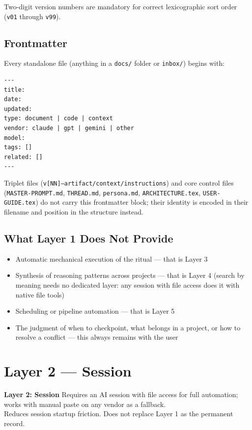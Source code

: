 \documentclass[12pt,letterpaper]{article}
\begin{document}
Two-digit version numbers are mandatory for correct lexicographic sort
order (\texttt{v01} through \texttt{v99}).

\subsection{Frontmatter}

Every standalone file (anything in a \texttt{docs/} folder or \texttt{inbox/})
begins with:

\begin{lstlisting}
---
title:
date:
updated:
type: document | code | context
vendor: claude | gpt | gemini | other
model:
tags: []
related: []
---
\end{lstlisting}

Triplet files (\texttt{v[NN]--artifact/context/instructions}) and core
control files (\texttt{MASTER-PROMPT.md}, \texttt{THREAD.md},
\texttt{persona.md}, \texttt{ARCHITECTURE.tex}, \texttt{USER-GUIDE.tex})
do not carry this frontmatter block; their identity is encoded in their
filename and position in the structure instead.

\subsection{What Layer 1 Does Not Provide}

\begin{itemize}
  \item Automatic mechanical execution of the ritual --- that is Layer 3
  \item Synthesis of reasoning patterns across projects --- that is
        Layer 4 (search by meaning needs no dedicated layer: any
        session with file access does it with native file tools)
  \item Scheduling or pipeline automation --- that is Layer 5
  \item The judgment of when to checkpoint, what belongs in a project,
        or how to resolve a conflict --- this always remains with the user
\end{itemize}

\section{Layer 2 --- Session}

\begin{layerbox2}
\textbf{Layer 2: Session} \quad Requires an AI session with file access for full automation;\\
works with manual paste on any vendor as a fallback.\\
Reduces session startup friction. Does not replace Layer 1 as the permanent record.
\end{layerbox2}
\end{document}
